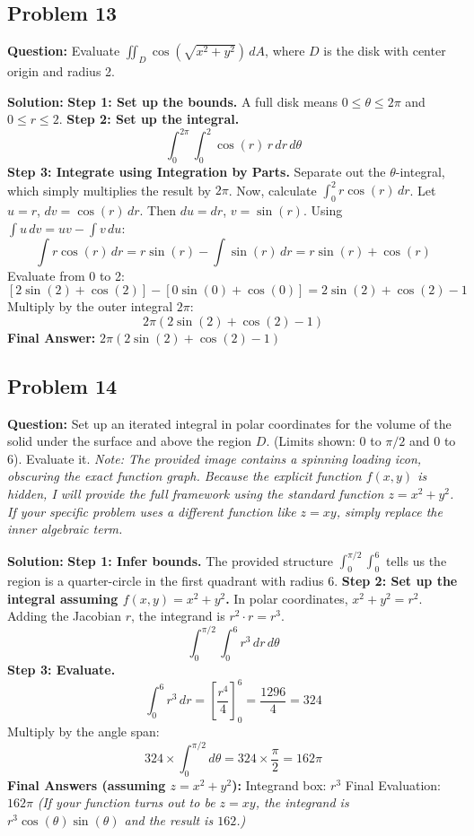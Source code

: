 \documentclass[12pt]{article}
\begin{document}
\subsection*{Problem 13}
\textbf{Question:} Evaluate $\iint_D \cos(\sqrt{x^2+y^2}) \, dA$, where $D$ is the disk with center origin and radius 2.

\textbf{Solution:}
\textbf{Step 1: Set up the bounds.}
A full disk means $0 \le \theta \le 2\pi$ and $0 \le r \le 2$.
\textbf{Step 2: Set up the integral.}
\[ \int_0^{2\pi} \int_0^2 \cos(r) \, r \, dr \, d\theta \]
\textbf{Step 3: Integrate using Integration by Parts.}
Separate out the $\theta$-integral, which simply multiplies the result by $2\pi$.
Now, calculate $\int_0^2 r\cos(r) \, dr$.
Let $u = r$, $dv = \cos(r) \, dr$.
Then $du = dr$, $v = \sin(r)$.
Using $\int u \, dv = uv - \int v \, du$:
\[ \int r\cos(r) \, dr = r\sin(r) - \int \sin(r) \, dr = r\sin(r) + \cos(r) \]
Evaluate from 0 to 2:
\[ \left[ 2\sin(2) + \cos(2) \right] - \left[ 0\sin(0) + \cos(0) \right] = 2\sin(2) + \cos(2) - 1 \]
Multiply by the outer integral $2\pi$:
\[ 2\pi(2\sin(2) + \cos(2) - 1) \]
\textbf{Final Answer:} $2\pi(2\sin(2) + \cos(2) - 1)$

\subsection*{Problem 14}
\textbf{Question:} Set up an iterated integral in polar coordinates for the volume of the solid under the surface and above the region $D$. (Limits shown: $0$ to $\pi/2$ and $0$ to $6$). Evaluate it.
\textit{Note: The provided image contains a spinning loading icon, obscuring the exact function graph. Because the explicit function $f(x,y)$ is hidden, I will provide the full framework using the standard function $z = x^2 + y^2$. If your specific problem uses a different function like $z = xy$, simply replace the inner algebraic term.}

\textbf{Solution:}
\textbf{Step 1: Infer bounds.}
The provided structure $\int_0^{\pi/2} \int_0^6$ tells us the region is a quarter-circle in the first quadrant with radius 6. 
\textbf{Step 2: Set up the integral assuming $f(x,y) = x^2 + y^2$.}
In polar coordinates, $x^2 + y^2 = r^2$.
Adding the Jacobian $r$, the integrand is $r^2 \cdot r = r^3$.
\[ \int_0^{\pi/2} \int_0^6 r^3 \, dr \, d\theta \]
\textbf{Step 3: Evaluate.}
\[ \int_0^6 r^3 \, dr = \left[ \frac{r^4}{4} \right]_0^6 = \frac{1296}{4} = 324 \]
Multiply by the angle span:
\[ 324 \times \int_0^{\pi/2} d\theta = 324 \times \frac{\pi}{2} = 162\pi \]
\textbf{Final Answers (assuming $z=x^2+y^2$):}
Integrand box: $r^3$
Final Evaluation: $162\pi$
\textit{(If your function turns out to be $z=xy$, the integrand is $r^3\cos(\theta)\sin(\theta)$ and the result is $162$.)}
\end{document}
